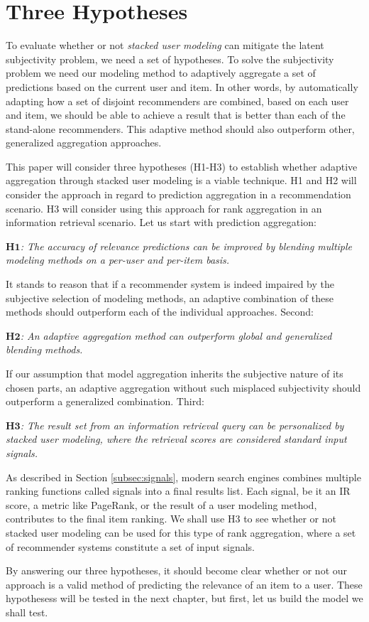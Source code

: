 \section{Three Hypotheses}
\label{sec:hypotheses}

To evaluate whether or not \emph{stacked user modeling}
can mitigate the latent subjectivity problem,
we need a set of hypotheses.
To solve the subjectivity problem we need our modeling method
to adaptively aggregate a set of predictions based on the current user and item.
In other words, by automatically adapting how a set of disjoint recommenders
are combined, based on each user and item, we should be able to achieve a
result that is better than each of the stand-alone recommenders.
This adaptive method should also outperform other, generalized aggregation approaches.

This paper will consider three hypotheses (H1-H3) 
to establish whether adaptive aggregation through stacked user modeling is a viable technique.
H1 and H2 will consider the approach in regard to prediction aggregation
in a recommendation scenario. H3 will consider using this approach for
rank aggregation in an information retrieval scenario.
Let us start with prediction aggregation:

{
  \itshape
  $\mathbf{H1}$: The accuracy of relevance predictions can be improved
  by blending multiple modeling methods on a per-user and per-item basis.
}

It stands to reason that if a recommender system is indeed impaired
by the subjective selection of modeling methods,
an adaptive combination of these methods should outperform each of the individual approaches.
Second:

{
  \itshape
  $\mathbf{H2}$: An adaptive aggregation method can outperform global and generalized 
  blending methods.
}

If our assumption that model aggregation inherits the subjective nature of its chosen parts,
an adaptive aggregation without such misplaced subjectivity should outperform a
generalized combination.
Third:

{
  \itshape
  $\mathbf{H3}$: The result set from an information retrieval query
  can be personalized by stacked user modeling, where the retrieval scores are considered 
  standard input signals.
}

As described in Section \ref{subsec:signals},
modern search engines combines multiple ranking functions called signals into a final results list.
Each signal, be it an IR score, a metric like PageRank, or the result of a user modeling method,
contributes to the final item ranking.
We shall use H3 to see whether or not stacked user modeling can be used for this type of rank aggregation,
where a set of recommender systems constitute a set of input signals.

By answering our three hypotheses, it should become clear whether or not our approach
is a valid method of predicting the relevance of an item to a user.
These hypothesess will be tested in the next chapter, but first, let us build
the model we shall test.

